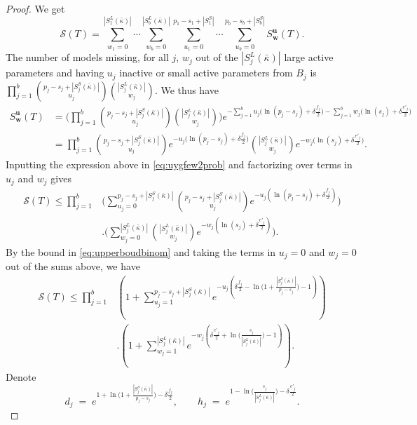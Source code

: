 \documentclass[
  12pt]{article}
\newcommand{\bu}{\mathbf{u}}
\newcommand{\bw}{\mathbf{w}}
\begin{document}
\begin{proof}
We get
\begin{equation}\label{eq:uygfew2prob}
    \mathcal{S}(T)=\sum_{w_1=0}^{|S^L_1(\bar{\kappa})|}\cdots\sum_{w_b=0}^{|S^L_b(\bar{\kappa})|}\sum_{u_1=0}^{p_1-s_1+|S_1^S|}\cdots\sum_{u_b=0}^{p_b-s_b+|S_b^S|}S^{\bu}_{\bw}(T).
\end{equation}
The number of models missing, for all $j$, $w_j$ out of the $|S^L_j(\bar{\kappa})|$ large active parameters and having $u_j$ inactive or small active parameters from $B_j$ is $\prod_{j=1}^b {\binom{p_j-s_j+|S^S_j(\bar{\kappa})|}{u_j}}{\binom{|S^L_j(\bar{\kappa})|}{w_j}}$. We thus have
\begin{align*}
    S^{\bu}_{\bw}(T)&= \bigg(\prod_{j=1}^b {\binom{p_j-s_j+|S^S_j(\bar{\kappa})|}{u_j}}{\binom{|S^L_j(\bar{\kappa})|}{w_j}}\bigg)e^{- \sum_{j=1}^b u_j\big(\ln(p_j-s_j)+\delta \tfrac{f_j}{2}\big)-\sum_{j=1}^b w_j\big(\ln(s_j)+\delta \tfrac{e'_j}{2}\big)} \\
    &= \prod_{j=1}^b {\binom{p_j-s_j+|S^S_j(\bar{\kappa})|}{u_j}}e^{- u_j\big(\ln(p_j-s_j)+\delta \tfrac{f_j}{2}\big)}{\binom{|S^L_j(\bar{\kappa})|}{w_j}}e^{-w_j\big(\ln(s_j)+\delta \tfrac{e'_j}{2}\big)}.
\end{align*}
Inputting the expression above in \eqref{eq:uygfew2prob} and factorizing over terms in $u_j$ and $w_j$ gives
\begin{align*}
    \mathcal{S}(T)\leq\prod_{j=1}^b & \Bigg(\sum_{u_j=0}^{p_j-s_j+|S^S_j(\bar{\kappa})|}{\binom{p_j-s_j+|S^S_j(\bar{\kappa})|}{u_j}}e^{- u_j(\ln(p_j-s_j)+\delta \tfrac{f_j}{2})}\Bigg)\\&.\Bigg(
    \sum_{w_j=0}^{|S^L_j(\bar{\kappa})|}{\binom{|S^L_j(\bar{\kappa})|}{w_j}}
    e^{-w_j(\ln(s_j)+\delta \tfrac{e'_j}{2})}\Bigg).
\end{align*}
By the bound in \eqref{eq:upperboudbinom} and taking the terms in $u_j=0$ and $w_j=0$ out of the sums above, %
we have
\begin{align}\label{eq:ogrprob}
    \mathcal{S}(T)\leq\prod_{j=1}^b & \left(1+\sum_{u_j=1}^{p_j-s_j+|S_j^{S}(\bar{\kappa})|}e^{-u_j\left(\delta \tfrac{f_j}{2}-\ln\big(1+\frac{|S^{S}_j(\bar{\kappa})|}{p_j-s_j}\big)-1\right)}\right)\\&.\left(1+
    \sum_{w_j=1}^{|S_j^{L}(\bar{\kappa})|}    e^{-w_j\left(\delta \tfrac{e'_j}{2}+\ln\big(\frac{s_j}{|S_j^{L}(\bar{\kappa})|}\big)-1\right)}\right).\nonumber
\end{align}
Denote
$$
d_j\;=\;e^{1+\ln\big(1+\frac{|S^{S}_j(\bar{\kappa})|}{p_j-s_j}\big)-\delta \tfrac{f_j}{2}},\qquad h_j\;=\;e^{1-\ln\big(\frac{s_j}{|S_j^{L}(\bar{\kappa})|}\big)-\delta \tfrac{e'_j}{2}}.
$$
\end{proof}
\end{document}
